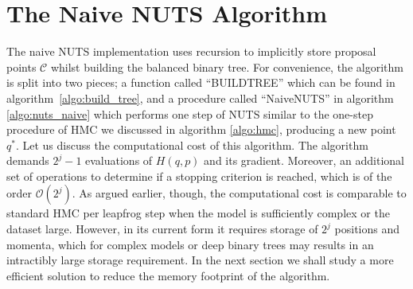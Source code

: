 \section{The Naive NUTS Algorithm}
The naive NUTS implementation uses recursion to implicitly store proposal points $\mathcal{C}$ whilst building the balanced binary tree.
For convenience, the algorithm is split into two pieces; a function called ``BUILDTREE'' which can be found in algorithm~\ref{algo:build_tree},
and a procedure called ``NaiveNUTS'' in algorithm \ref{algo:nuts_naive} which performs one step of NUTS similar to the one-step procedure of HMC we discussed in algorithm \ref{algo:hmc}, producing
a new point $q^*$. Let us discuss the computational cost of this algorithm. The algorithm demands $2^j - 1$ evaluations of $H(q, p)$ and its gradient. Moreover, an additional set of
operations to determine if a stopping criterion is reached, which is of the order $\mathcal{O}(2^j)$. As argued earlier, though, the computational cost is comparable to standard HMC
per leapfrog step
when the model is sufficiently complex or the dataset large. However, in its current form it requires storage of $2^j$ positions and momenta, which for complex models
or deep binary trees may results in an intractibly large storage requirement. In the next section we shall study a more efficient solution to reduce the memory footprint 
of the algorithm.


